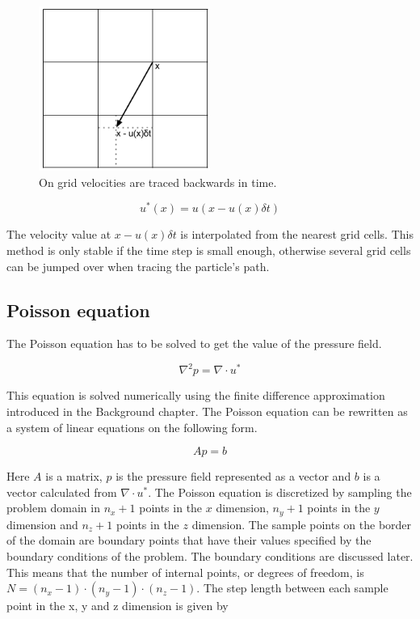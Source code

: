 \begin{figure}[ht]
	\center
	\includegraphics[width=0.5\textwidth]{images/advect_back_trace}
	\caption{On grid velocities are traced backwards in time.}
	\label{fig:backtrace}
\end{figure}

$$ u^*(x) = u(x - u(x) \delta t) $$

The velocity value at $ x - u(x) \delta t $ is interpolated from the nearest
grid cells. This method is only stable if the time step is small enough, 
otherwise several grid cells can be jumped over when tracing the particle's
path. 

\subsection{Poisson equation}

The Poisson equation has to be solved to get the value of the pressure field. 

$$ \nabla^2 p = \nabla \cdot u^* $$

This equation is solved numerically using the finite difference approximation
introduced in the Background chapter. The Poisson equation can be rewritten as 
a system of linear equations on the following form.

$$ Ap = b $$

Here $A$ is a matrix, $p$ is the pressure field represented as a vector and $b$
is a vector calculated from $\nabla \cdot u^*$. The Poisson equation is discretized 
by sampling the problem domain in $n_x+1$ points in the $x$ dimension, $n_y+1$
points in the $y$ dimension and $n_z+1$ points in the $z$ dimension. The sample
points on the border of the domain are boundary points that have their values
specified by the boundary conditions of the problem. The boundary conditions
are discussed later. This means that the number of internal points, or degrees of
freedom, is $N = (n_x-1) \cdot (n_y-1) \cdot (n_z-1)$. The step length between 
each sample point in the x, y and z dimension is given by 

